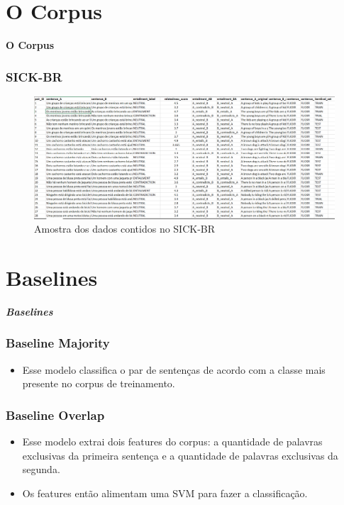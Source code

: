 \documentclass{beamer}
\begin{document}
\section{O Corpus}
	\begin{frame}
\centering \textbf{O Corpus\\}
\end{frame}

\begin{frame}
\frametitle{SICK-BR}
\begin{figure}
	\centering
	\includegraphics[width=0.7\linewidth]{Sick-BR}
	\caption{Amostra dos dados contidos no SICK-BR}
	\label{fig:sick-br}
\end{figure}

\end{frame}
\section{Baselines}
	\begin{frame}
\centering \textbf{\textit{Baselines}\\}
\end{frame}

\begin{frame}
	\frametitle{Baseline Majority}
	\begin{itemize}
	\item Esse modelo classifica o par de sentenças de acordo com a classe mais presente no corpus de treinamento.\\	
	\end{itemize}
\end{frame}


\begin{frame}
\frametitle{Baseline Overlap}
\begin{itemize}
	\item Esse modelo extrai dois features do corpus: a quantidade de palavras exclusivas da primeira sentença e a quantidade de palavras exclusivas da segunda.\\
	\item Os features então alimentam uma SVM para fazer a classificação.\\
\end{itemize}
\end{frame}
\end{document}
